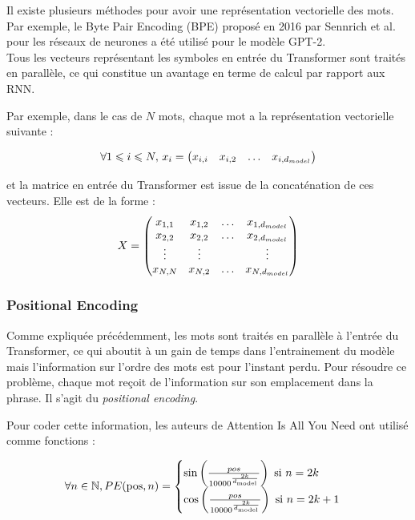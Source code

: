 Il existe plusieurs méthodes pour avoir une représentation vectorielle des mots.
Par exemple, le Byte Pair Encoding (BPE)\cite{sennrich2016bpe} proposé en 2016 par Sennrich et al. pour
les réseaux de neurones a été utilisé pour le modèle GPT-2\cite{radford2019gpt2}. \\


Tous les vecteurs représentant les symboles en entrée du Transformer sont traités en parallèle,
ce qui constitue un avantage en terme de calcul par rapport aux RNN.

Par exemple, dans le cas de $N$ mots,
chaque mot a la représentation vectorielle suivante :

\[ \forall 1 \leqslant i \leqslant N , \, x_i =
\begin{pmatrix}
  x_{i,i} & x_{i,2} & \ldots & x_{i,d_{model}}
\end{pmatrix}
 \]

et la matrice en entrée du Transformer est issue de la concaténation de ces vecteurs. Elle est de la forme :
\[ X =
\begin{pmatrix}
  x_{1,1} & x_{1,2} & \ldots & x_{1,d_{model}} \\
  x_{2,2} & x_{2,2} & \ldots & x_{2,d_{model}} \\
  \vdots  & \vdots  &        & \vdots \\
  x_{N,N} & x_{N,2} & \ldots & x_{N,d_{model}}
\end{pmatrix}
\]

\subsubsection{Positional Encoding}

Comme expliquée précédemment, les mots sont traités en parallèle à l'entrée du Transformer, ce qui aboutit à un gain de
temps dans l'entrainement du modèle mais l'information sur l'ordre des mots est pour l'instant perdu. Pour résoudre
ce problème, chaque mot reçoit de l'information sur son emplacement dans la phrase. Il s'agit du \textit{positional encoding}.

Pour coder cette information, les auteurs de \og Attention Is All You Need \fg{} \cite{vaswani2017attention} ont utilisé comme fonctions :

\[ \forall n \in \mathbb{N}, PE(\text{pos}, n) =
\begin{cases}
  \sin\left( \frac{pos}{10 000^{ \frac{2k}{d_\text{model}}}} \right) \text{ si } n = 2k\\
  \cos\left( \frac{pos}{10 000^{ \frac{2k}{d_\text{model}}}} \right) \text{ si } n = 2k+1 \\
\end{cases} \]

